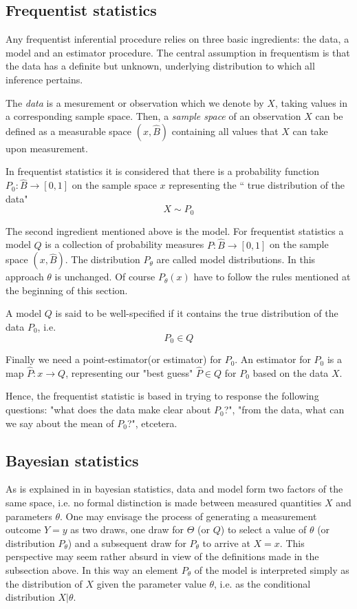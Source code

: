 \documentclass[onecolumn,           %
               showpacs,            %
               preprintnumbers,     %
               aps,                 %
               prl,          	    %
               letterpaper,             %
               superscriptaddress,      %
               nofootinbib,         %
               tightenlines,        %
               floats,floatfix      %
               ,usenatbib,
               ]{revtex4-1}
\begin{document}
\subsection{Frequentist statistics}

Any frequentist inferential procedure relies on three basic ingredients: the data, a model and an estimator procedure. The central assumption in frequentism is that the data has a definite but unknown, underlying distribution to which all inference pertains.

The \textit{data} is a mesurement or observation which we denote by $X$, taking values in a corresponding sample space. Then, a \textit{sample space} of an observation $X$ can be defined as a measurable space $(x,\hat B)$ containing all values that $X$ can take upon measurement.

In frequentist statistics it is considered that there is a probability function $P_0:\hat B\rightarrow [0,1]$ on the sample space $x$ representing the `` true distribution of the data"
\[X\sim P_0\]

The second ingredient mentioned above is the model. For frequentist statistics a model $Q$ is a collection of probability measures $P:\hat B\rightarrow[0,1]$ on the sample space $(x,\hat B)$. The distribution $P_\theta$ are called model distributions. In this approach $\theta$ is unchanged.  Of course $P_\theta(x)$ have to follow the rules mentioned at the beginning of this section.

A model $Q$ is said to be well-specified if it contains the true distribution of the data $P_0$, i.e.
\[P_0\in Q\]

Finally we need a point-estimator(or estimator) for $P_0$. An estimator for $P_0$ is a map $\hat P:x\rightarrow Q$, representing our "best guess" $\hat P\in Q$ for $P_0$ based on the data $X$.

Hence, the frequentist statistic is based in trying to response the following questions: "what does the data make clear about $P_0$?", "from the data, what can we say about the mean of $P_0$?",  etcetera.

\subsection{Bayesian statistics}

As is explained in \cite{bayeslecture} in bayesian statistics, data and model form two factors of the same space, i.e. no formal distinction is made between measured quantities $X$ and parameters $\theta$. One may envisage the process of generating a measurement outcome $Y=y$ as two draws, one draw for $\Theta$ (or $Q$)
to select a value of $\theta$ (or distribution $P_\theta$) and a subsequent draw for $P_\theta$ to arrive at $X=x$. This perspective may seem rather absurd in view of the definitions made in the subsection above. In this way an element $P_\theta$ of the model is interpreted simply as the distribution of $X$ given the parameter value $\theta$, i.e. as the conditional distribution $X|\theta$.
\end{document}
